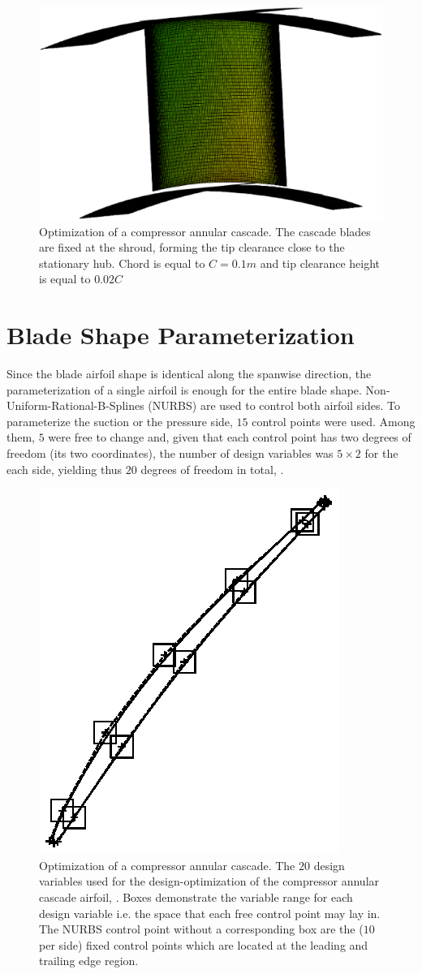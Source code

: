 \begin{figure}[h!]
\centering
  \includegraphics[width=.7\textwidth]{blade.eps}
  \caption{Optimization of a compressor annular cascade. The cascade blades are fixed at the shroud, forming the tip clearance close to the stationary hub. Chord is equal to $C=0.1m$ and tip clearance height is equal to $0.02C$}
  \label{res:ntua_blade:blade}
\end{figure}

\section{Blade Shape Parameterization}
Since the blade airfoil shape is identical along the spanwise direction, the parameterization of a single airfoil is enough for the entire blade shape. Non-Uniform-Rational-B-Splines (NURBS) are used to control both airfoil sides. To parameterize the suction or the pressure side, $15$ control points were used. Among them, $5$ were free to change and, given that each control point has two degrees of freedom (its two coordinates), the number of design variables was $5 \times 2$ for the each side, yielding thus $20$ degrees of freedom in total, \cite{phd_Kampolis}. 

\begin{figure}[h!]
\centering
  \includegraphics[width=.5\textwidth]{foil_cp2.eps}
  \caption{Optimization of a compressor annular cascade. The $20$ design variables used for the design-optimization of the compressor annular cascade airfoil, \cite{phd_Kampolis}. Boxes demonstrate the variable range for each design variable i.e. the space that each free control point may lay in. The NURBS control point without a corresponding box are the ($10$ per side) fixed control points which are located at the leading and trailing edge region.}
  \label{res:ntua_blade:cp}
\end{figure}



